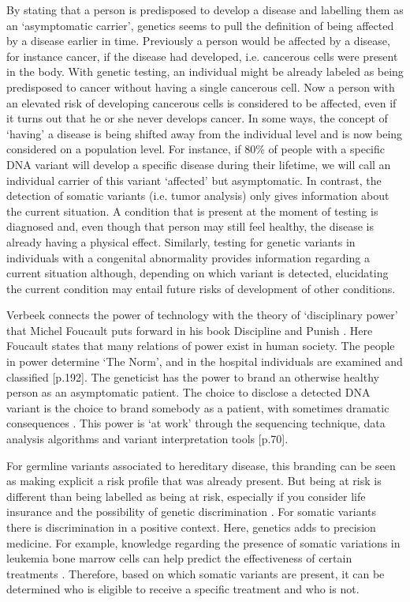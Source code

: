By stating that a person is predisposed to develop a disease and labelling them as an ‘asymptomatic carrier’, genetics seems to pull the definition of being affected by a disease earlier in time. 
Previously a person would be affected by a disease, for instance cancer, if the disease had developed, i.e. cancerous cells were present in the body. 
With genetic testing, an individual might be already labeled as being predisposed to cancer without having a single cancerous cell. 
Now a person with an elevated risk of developing cancerous cells is considered to be affected, even if it turns out that he or she never develops cancer. In some ways, the concept of ‘having’ a disease is being shifted away from the individual level and is now being considered on a population level. 
For instance, if 80\% of people with a specific DNA variant will develop a specific disease during their lifetime, we will call an individual carrier of this variant ‘affected’ but asymptomatic. 
In contrast, the detection of somatic variants (i.e. tumor analysis) only gives information about the current situation. 
A condition that is present at the moment of testing is diagnosed and, even though that person may still feel healthy, the disease is already having a physical effect. 
Similarly, testing for genetic variants in individuals with a congenital abnormality provides information regarding a current situation although, depending on which variant is detected, elucidating the current condition may entail future risks of development of other conditions. 

Verbeek connects the power of technology with the theory of ‘disciplinary power’ that Michel Foucault puts forward in his book Discipline and Punish \cite{Foucault_1978}. 
Here Foucault states that many relations of power exist in human society. 
The people in power determine ‘The Norm’, and in the hospital individuals are examined and classified [p.192].
The geneticist has the power to brand an otherwise healthy person as an asymptomatic patient. 
The choice to disclose a detected DNA variant is the choice to brand somebody as a patient, with sometimes dramatic consequences \cite{Fulda_2006}. 
This power is ‘at work’ through the sequencing technique, data analysis algorithms and variant interpretation tools \cite{Verbeek_2011}[p.70]. 

For germline variants associated to hereditary disease, this branding can be seen as making explicit a risk profile that was already present. 
But being at risk is different than being labelled as being at risk, especially if you consider life insurance and the possibility of genetic discrimination \cite{Dalpe_2017,erfelijkheid.nl_nd}. 
For somatic variants there is discrimination in a positive context. Here, genetics adds to precision medicine. For example, knowledge regarding the presence of somatic variations in leukemia bone marrow cells can help predict the effectiveness of certain treatments \cite{Motyckova_2010,Marum_2016,Winters_2017,Baccarani_2013}. 
Therefore, based on which somatic variants are present, it can be determined who is eligible to receive a specific treatment and who is not.

